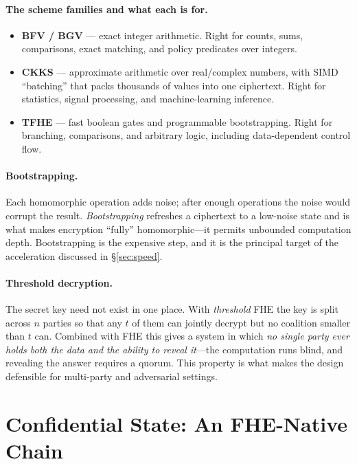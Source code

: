 \documentclass[11pt,letterpaper]{article}
\begin{document}
\paragraph{The scheme families and what each is for.}
\begin{itemize}
  \item \textbf{BFV / BGV} --- exact integer arithmetic. Right for counts, sums,
  comparisons, exact matching, and policy predicates over integers.
  \item \textbf{CKKS} --- approximate arithmetic over real/complex numbers, with
  SIMD ``batching'' that packs thousands of values into one ciphertext. Right for
  statistics, signal processing, and machine-learning inference.
  \item \textbf{TFHE} --- fast boolean gates and programmable bootstrapping. Right
  for branching, comparisons, and arbitrary logic, including data-dependent control
  flow.
\end{itemize}

\paragraph{Bootstrapping.} Each homomorphic operation adds noise; after enough
operations the noise would corrupt the result. \emph{Bootstrapping} refreshes a
ciphertext to a low-noise state and is what makes encryption ``fully''
homomorphic---it permits unbounded computation depth. Bootstrapping is the
expensive step, and it is the principal target of the acceleration discussed in
\S\ref{sec:speed}.

\paragraph{Threshold decryption.} The secret key need not exist in one place. With
\emph{threshold} FHE the key is split across $n$ parties so that any $t$ of them can
jointly decrypt but no coalition smaller than $t$ can. Combined with FHE this gives
a system in which \emph{no single party ever holds both the data and the ability to
reveal it}---the computation runs blind, and revealing the answer requires a quorum.
This property is what makes the design defensible for multi-party and adversarial
settings.

\section{Confidential State: An FHE-Native Chain}
\end{document}
